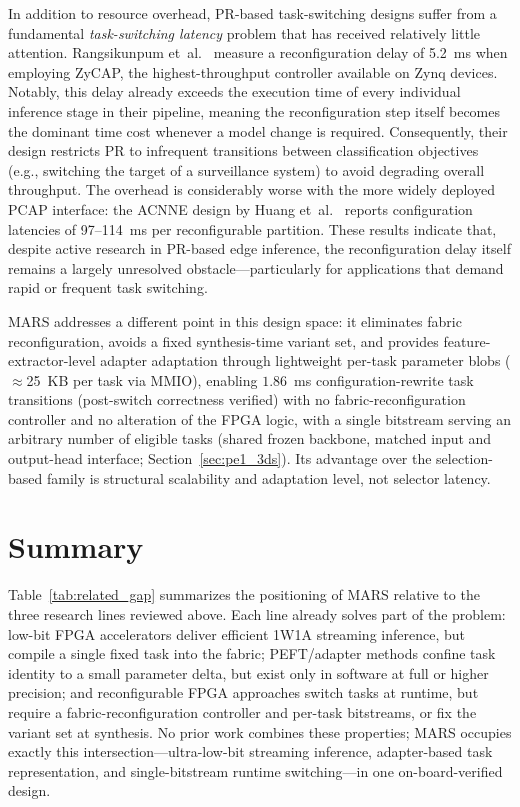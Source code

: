 \documentclass[12pt, a4paper]{report}
\numberwithin{equation}{chapter}
\numberwithin{figure}{chapter}
\numberwithin{table}{chapter}
\numberwithin{algorithm}{chapter}
\begin{document}
In addition to resource overhead, PR-based task-switching designs suffer from a fundamental \emph{task-switching latency} problem that has received relatively little attention. Rangsikunpum et~al.~\cite{Rangsikunpum2024CoarseToFine} measure a reconfiguration delay of 5.2~ms when employing ZyCAP, the highest-throughput controller available on Zynq devices. Notably, this delay already exceeds the execution time of every individual inference stage in their pipeline, meaning the reconfiguration step itself becomes the dominant time cost whenever a model change is required. Consequently, their design restricts PR to infrequent transitions between classification objectives (e.g., switching the target of a surveillance system) to avoid degrading overall throughput. The overhead is considerably worse with the more widely deployed PCAP interface: the ACNNE design by Huang et~al.~\cite{Huang2024ACNNE} reports configuration latencies of 97--114~ms per reconfigurable partition. These results indicate that, despite active research in PR-based edge inference, the reconfiguration delay itself remains a largely unresolved obstacle---particularly for applications that demand rapid or frequent task switching.

MARS addresses a different point in this design space: it eliminates fabric reconfiguration, avoids a fixed synthesis-time variant set, and provides feature-extractor-level adapter adaptation through lightweight per-task parameter blobs ($\approx$25~KB per task via MMIO), enabling $1.86$~ms configuration-rewrite task transitions (post-switch correctness verified) with no fabric-reconfiguration controller and no alteration of the FPGA logic, with a single bitstream serving an arbitrary number of eligible tasks (shared frozen backbone, matched input and output-head interface; Section~\ref{sec:pe1_3ds}). Its advantage over the selection-based family is structural scalability and adaptation level, not selector latency.

\section*{Summary}

Table~\ref{tab:related_gap} summarizes the positioning of MARS relative to the three research lines reviewed above. Each line already solves part of the problem: low-bit FPGA accelerators deliver efficient 1W1A streaming inference, but compile a single fixed task into the fabric; PEFT/adapter methods confine task identity to a small parameter delta, but exist only in software at full or higher precision; and reconfigurable FPGA approaches switch tasks at runtime, but require a fabric-reconfiguration controller and per-task bitstreams, or fix the variant set at synthesis. No prior work combines these properties; MARS occupies exactly this intersection---ultra-low-bit streaming inference, adapter-based task representation, and single-bitstream runtime switching---in one on-board-verified design.
\end{document}
